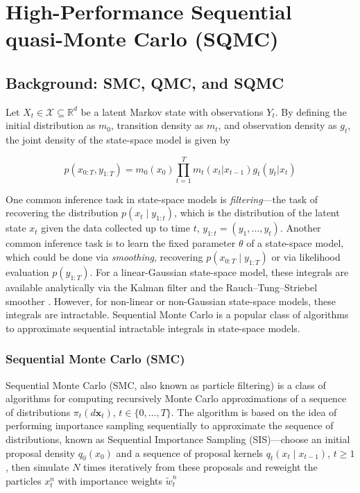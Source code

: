 \chapter{High-Performance Sequential quasi-Monte Carlo (SQMC)}
\label{ch:sqmc}

\section{Background: SMC, QMC, and SQMC}
\label{sec:background}

Let $X_t \in \mathcal{X} \subseteq \mathbb{R}^d$ be a latent Markov state with observations $Y_t$. By defining the initial distribution as $m_0$, transition density as $m_t$, and observation density as $g_t$, the joint density of the state-space model is given by

\begin{equation}
\label{eq:state-space-model}
p(x_{0:T}, y_{1:T}) = m_0(x_0) \prod_{t=1}^T m_t(x_t | x_{t-1}) g_t(y_t | x_t)
\end{equation}

One common inference task in state-space models is \textit{filtering}---the task of recovering the distribution $p(x_{t} \mid y_{1:t})$, which is the distribution of the latent state $x_t$ given the data collected up to time $t$, $y_{1:t} = (y_1, \ldots, y_t)$. Another common inference task is to learn the fixed parameter $\theta$ of a state-space model, which could be done via \textit{smoothing}, recovering $p(x_{0:T} \mid y_{1:T})$ or via likelihood evaluation $p(y_{1:T})$. For a linear-Gaussian state-space model, these integrals are available analytically via the Kalman filter and the Rauch--Tung--Striebel smoother \citep{kalmandbucy1961filtering,rauchtungstriebel1965}. However, for non-linear or non-Gaussian state-space models, these integrals are intractable. Sequential Monte Carlo is a popular class of algorithms to approximate sequential intractable integrals in state-space models.

\subsection{Sequential Monte Carlo (SMC)}
\label{sec:smc}


Sequential Monte Carlo (SMC, also known as particle filtering) is a class of algorithms for computing recursively Monte Carlo approximations of a sequence of distributions $\pi_t (d \mathbf{x}_t)$, $t \in \{0, \ldots, T\}$. The algorithm is based on the idea of performing importance sampling sequentially to approximate the sequence of distributions, known as Sequential Importance Sampling (SIS)---choose an initial proposal density $q_0(x_0)$ and a sequence of proposal kernels $q_t(x_t \mid x_{t-1})$, $t \geq 1$, then simulate $N$ times iteratively from these proposals and reweight the particles $x_t^n$ with importance weights $\tilde{w}_t^n$

